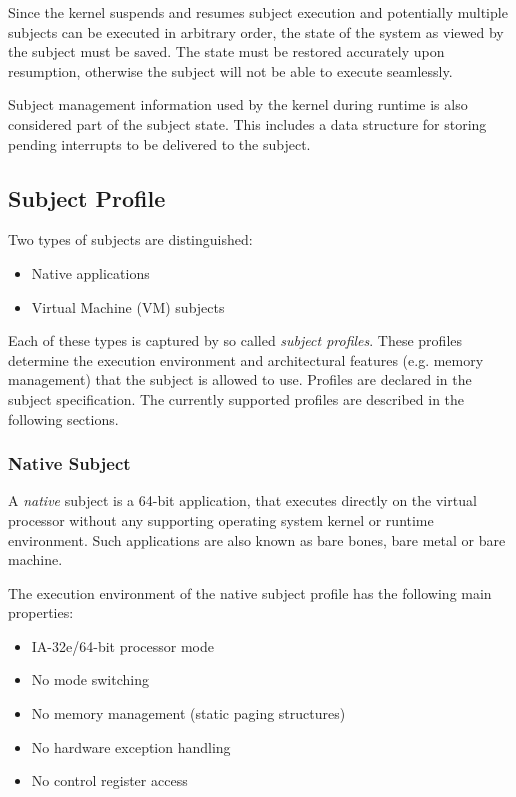 Since the kernel suspends and resumes subject execution and potentially
multiple subjects can be executed in arbitrary order, the state of the system
as viewed by the subject must be saved. The state must be restored accurately
upon resumption, otherwise the subject will not be able to execute seamlessly.

Subject management information used by the kernel during runtime is also
considered part of the subject state. This includes a data structure for
storing pending interrupts to be delivered to the subject.

\subsection{Subject Profile}
Two types of subjects are distinguished:

\begin{itemize}
	\item Native applications
	\item Virtual Machine (VM) subjects
\end{itemize}

Each of these types is captured by so called \emph{subject
profiles}. These profiles determine the execution
environment and architectural features (e.g.  memory management) that the
subject is allowed to use. Profiles are declared in the subject specification.
The currently supported profiles are described in the following sections.

\subsubsection{Native Subject}
A \emph{native} subject is a 64-bit application, that executes directly on the
virtual processor without any supporting operating system kernel or runtime
environment. Such applications are also known as bare bones, bare metal or bare
machine.

The execution environment of the native subject profile has the following main
properties:

\begin{itemize}
	\item IA-32e/64-bit processor mode
	\item No mode switching
	\item No memory management (static paging structures)
	\item No hardware exception handling
	\item No control register access
\end{itemize}

